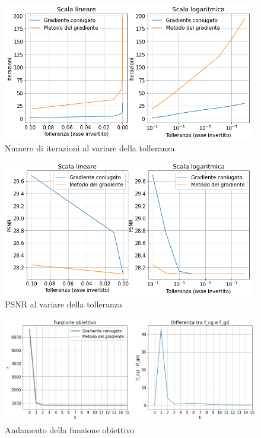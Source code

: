 \documentclass[11pt]{article}
\begin{document}
\begin{figure}[H]
    \centering
    \includegraphics[width=11cm]{iterazioni_cg_gd/2/tol_iter.png}
    \caption{Numero di iterazioni al variare della tolleranza}
    \label{fig:tol_iter2}
\end{figure}
\begin{figure}[H]
    \centering
    \includegraphics[width=11cm]{iterazioni_cg_gd/2/tol_psnr.png}
    \caption{PSNR al variare della tolleranza}
    \label{fig:tol_psnr2}
\end{figure}
\begin{figure}[H]
    \centering
    \includegraphics[width=14cm]{iterazioni_cg_gd/2/funzione_obiettivo.png}
    \caption{Andamento della funzione obiettivo}
    \label{fig:obiettivo2}
\end{figure}
\end{document}
